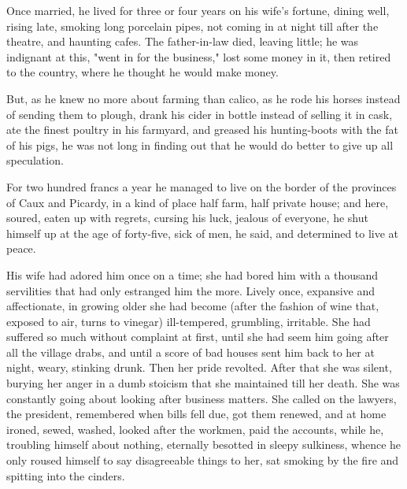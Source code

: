 \documentclass[11pt,twocolumn]{ltugboat}
\begin{document}
Once married, he lived for three or four years on his wife's fortune,
dining well, rising late, smoking long porcelain pipes, not coming in
at night till after the theatre, and haunting cafes. The father-in-law
died, leaving little; he was indignant at this, "went in for the
business," lost some money in it, then retired to the country, where he
thought he would make money.

But, as he knew no more about farming than calico, as he rode his horses
instead of sending them to plough, drank his cider in bottle instead of
selling it in cask, ate the finest poultry in his farmyard, and greased
his hunting-boots with the fat of his pigs, he was not long in finding
out that he would do better to give up all speculation.

For two hundred francs a year he managed to live on the border of
the provinces of Caux and Picardy, in a kind of place half farm, half
private house; and here, soured, eaten up with regrets, cursing his
luck, jealous of everyone, he shut himself up at the age of forty-five,
sick of men, he said, and determined to live at peace.

His wife had adored him once on a time; she had bored him with a
thousand servilities that had only estranged him the more. Lively once,
expansive and affectionate, in growing older she had become (after the
fashion of wine that, exposed to air, turns to vinegar) ill-tempered,
grumbling, irritable. She had suffered so much without complaint at
first, until she had seem him going after all the village drabs, and
until a score of bad houses sent him back to her at night, weary,
stinking drunk. Then her pride revolted. After that she was silent,
burying her anger in a dumb stoicism that she maintained till her death.
She was constantly going about looking after business matters. She
called on the lawyers, the president, remembered when bills fell due,
got them renewed, and at home ironed, sewed, washed, looked after the
workmen, paid the accounts, while he, troubling himself about nothing,
eternally besotted in sleepy sulkiness, whence he only roused himself
to say disagreeable things to her, sat smoking by the fire and spitting
into the cinders.
\end{document}
